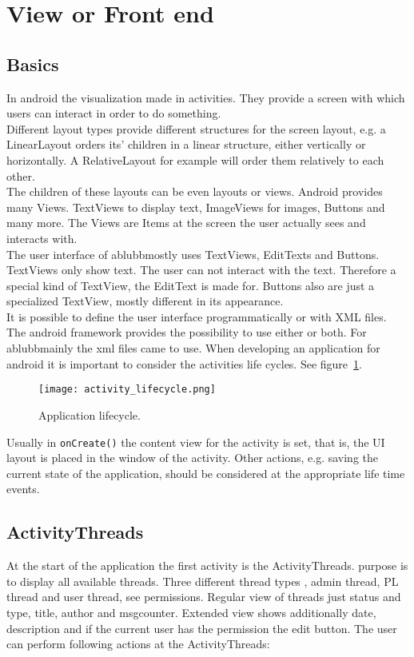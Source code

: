 \documentclass[12pt,a4paper,oneside]{report}
\newcommand{\appname}{ablubb}
\newcommand{\code}[1]{\lstinline{#1}}
\begin{document}
\section{View or Front end}

\subsection{Basics}
In android the visualization made in activities. They provide a screen with which users can interact in order to do something\citep{aDefActivities}.\\
 Different layout types provide different structures for the screen layout, e.g. a LinearLayout orders its'  children in a linear structure, either vertically or horizontally. A RelativeLayout for example will order them relatively to each other. \\
 The children of these layouts can be even layouts or views. Android provides many Views. TextViews to display text, ImageViews for images, Buttons and many more. The Views are Items at the screen the user actually sees and interacts with.\\
The user interface of \appname mostly uses TextViews, EditTexts and Buttons. TextViews only show text. The user can not interact with the text. Therefore a special kind of TextView, the EditText is made for. Buttons also are just a specialized TextView, mostly different in its appearance. \\
It is possible to define the user interface programmatically or with XML files. The android framework provides the possibility to use either or both. For \appname mainly the xml files came to use. 
When developing an application for android it is important to consider the activities life cycles. See figure~\ref{fig:activitylivecycle}.
 
\begin{figure}[!ht]
    \texttt{[image: activity\_lifecycle.png]}
	\caption{Application lifecycle.} 
	\label{fig:activitylivecycle}
\end{figure}

Usually in \code{onCreate()} the content view for the activity is set, that is, the UI layout is placed in the window of the activity. Other actions, e.g. saving the current state of the application, should be considered at the appropriate life time events.
\subsection{ActivityThreads}
At the start of the application the first activity is the ActivityThreads.
purpose is to display all available threads. Three different thread types , admin thread, PL thread and user thread, see permissions.
Regular view of threads just status and type, title, author and msgcounter. Extended view shows additionally date, description and if the current user has the permission the edit button.
The user can perform following actions at the ActivityThreads:
\end{document}
